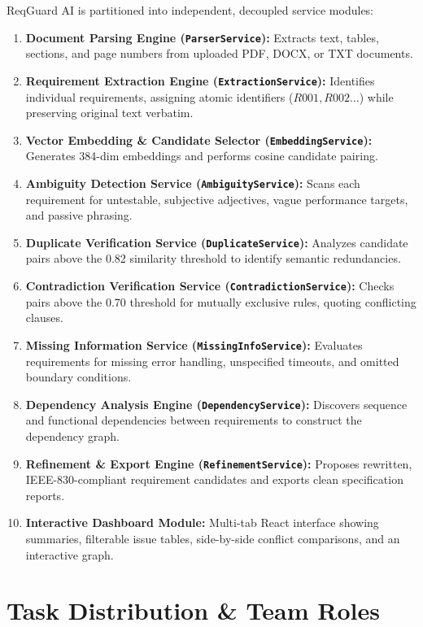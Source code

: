 \documentclass[11pt,a4paper]{article}
\begin{document}
ReqGuard AI is partitioned into independent, decoupled service modules:
\begin{enumerate}
  \item \textbf{Document Parsing Engine (\texttt{ParserService}):} Extracts text, tables, sections, and page numbers from uploaded PDF, DOCX, or TXT documents.
  \item \textbf{Requirement Extraction Engine (\texttt{ExtractionService}):} Identifies individual requirements, assigning atomic identifiers ($R001, R002\dots$) while preserving original text verbatim.
  \item \textbf{Vector Embedding \& Candidate Selector (\texttt{EmbeddingService}):} Generates 384-dim embeddings and performs cosine candidate pairing.
  \item \textbf{Ambiguity Detection Service (\texttt{AmbiguityService}):} Scans each requirement for untestable, subjective adjectives, vague performance targets, and passive phrasing.
  \item \textbf{Duplicate Verification Service (\texttt{DuplicateService}):} Analyzes candidate pairs above the 0.82 similarity threshold to identify semantic redundancies.
  \item \textbf{Contradiction Verification Service (\texttt{ContradictionService}):} Checks pairs above the 0.70 threshold for mutually exclusive rules, quoting conflicting clauses.
  \item \textbf{Missing Information Service (\texttt{MissingInfoService}):} Evaluates requirements for missing error handling, unspecified timeouts, and omitted boundary conditions.
  \item \textbf{Dependency Analysis Engine (\texttt{DependencyService}):} Discovers sequence and functional dependencies between requirements to construct the dependency graph.
  \item \textbf{Refinement \& Export Engine (\texttt{RefinementService}):} Proposes rewritten, IEEE-830-compliant requirement candidates and exports clean specification reports.
  \item \textbf{Interactive Dashboard Module:} Multi-tab React interface showing summaries, filterable issue tables, side-by-side conflict comparisons, and an interactive graph.
\end{enumerate}

\section{Task Distribution \& Team Roles}
\end{document}
